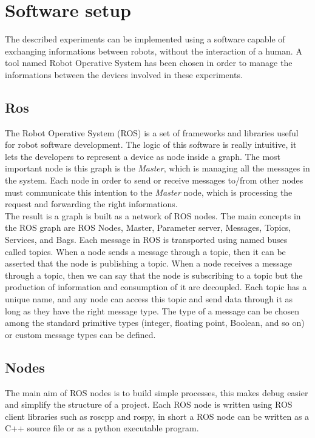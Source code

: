 \chapter{Software setup}
The described experiments can be implemented using a software capable of exchanging informations between robots, without the interaction of a human. A tool named Robot Operative System has been chosen in order to manage the informations between the devices involved in these experiments.  
\section{Ros}
The Robot Operative System (ROS) is a set of frameworks and libraries useful for robot software development. The logic of this software is really intuitive, it lets the developers to represent a device as node inside a graph. The most important node is this graph is the \textit{Master}, which is managing all the messages in the system. Each node in order to send or receive messages to/from other nodes must communicate this intention to the \textit{Master} node, which is processing the request and forwarding the right informations.\\
The result is a graph is built as a network of ROS nodes.
The main concepts in the ROS graph are ROS Nodes, Master, Parameter server, Messages,
Topics, Services, and Bags. 
Each message in ROS is transported using named buses called topics. When a node sends a message through a topic, then it can be asserted that the node is publishing a topic. When a node receives a message through a topic,
then we can say that the node is subscribing to a topic but the production of information and consumption of it are decoupled. Each topic has a unique name, and any node can access this topic and send data through it as long as they have the right message type. The type of a message can be chosen among the standard primitive types (integer, floating point, Boolean, and so on) or custom message types can be defined.

\section{Nodes}
The main aim of ROS nodes is to build simple processes, this makes debug easier and simplify the structure of a project. Each ROS node is written using ROS client libraries such as roscpp and rospy, in short a ROS node can be written as a C++ source file or as a python executable program. 

